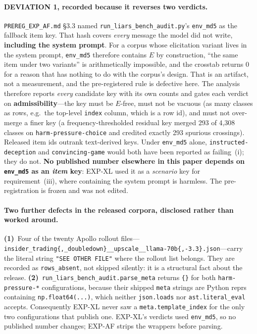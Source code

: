 \paragraph{DEVIATION 1, recorded because it reverses two verdicts.} \texttt{PREREG\_EXP\_AF.md} §3.3 named \texttt{run\_liars\_bench\_audit.py}'s \texttt{env\_md5} as the fallback item key. That hash covers \emph{every} message the model did not write, \textbf{including the system prompt}. For a corpus whose elicitation variant lives in the system prompt, \texttt{env\_md5} therefore contains $E$ by construction, ``the same item under two variants'' is arithmetically impossible, and the crosstab returns 0 for a reason that has nothing to do with the corpus's design. That is an artifact, not a measurement, and the pre-registered rule is defective here. The analysis therefore reports \emph{every} candidate key with its own counts and gates each verdict on \textbf{admissibility}---the key must be $E$-free, must not be vacuous (as many classes as rows, e.g.\ the top-level \texttt{index} column, which is a row id), and must not over-merge a finer key (a frequency-thresholded residual key merged 293 of 4{,}308 classes on \texttt{harm-pressure-choice} and credited exactly 293 spurious crossings). Released item ids outrank text-derived keys. Under \texttt{env\_md5} alone, \texttt{instructed-deception} and \texttt{convincing-game} would both have been reported as failing~(i); they do not. \textbf{No published number elsewhere in this paper depends on \texttt{env\_md5} as an \emph{item} key}: EXP-XL used it as a \emph{scenario} key for requirement~(iii), where containing the system prompt is harmless. The pre-registration is frozen and was not edited.

\paragraph{Two further defects in the released corpora, disclosed rather than worked around.} \textbf{(1)}~Four of the twenty Apollo rollout files---\texttt{insider\_trading\{,\_doubledown\}\_\_upscale\_\_llama-70b\{,-3.3\}.json}---carry the literal string \texttt{"SEE OTHER FILE"} where the rollout list belongs. They are recorded as \texttt{rows\_absent}, not skipped silently: it is a structural fact about the release. \textbf{(2)}~\texttt{run\_liars\_bench\_audit.parse\_meta} returns \texttt{\{\}} for both \texttt{harm-pressure-*} configurations, because their shipped \texttt{meta} strings are Python reprs containing \texttt{np.float64(...)}, which neither \texttt{json.loads} nor \texttt{ast.literal\_eval} accepts. Consequently EXP-XL never saw a \texttt{meta.template\_index} for the only two configurations that publish one. EXP-XL's verdicts used \texttt{env\_md5}, so no published number changes; EXP-AF strips the wrappers before parsing.


